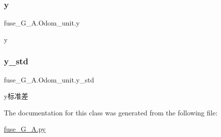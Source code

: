 \subsubsection{\texorpdfstring{y}{y}}
{\footnotesize\ttfamily fuse\+\_\+\+G\+\_\+\+A.\+Odom\+\_\+unit.\+y}



y 

\mbox{\label{classfuse___g___a_1_1_odom__unit_a4893465afd2b8aadc1f2a52eddf3047d}} 
\subsubsection{\texorpdfstring{y\+\_\+std}{y\_std}}
{\footnotesize\ttfamily fuse\+\_\+\+G\+\_\+\+A.\+Odom\+\_\+unit.\+y\+\_\+std}



y标准差 



The documentation for this class was generated from the following file\+:\begin{DoxyCompactItemize}
\item 
\hyperlink{fuse___g___a_8py}{fuse\+\_\+\+G\+\_\+\+A.\+py}\end{DoxyCompactItemize}
